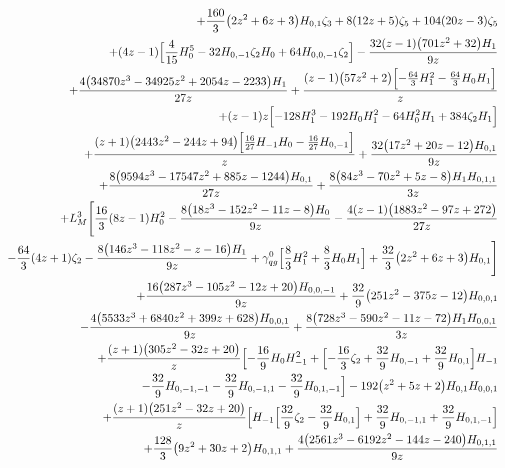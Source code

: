 \begin{eqnarray}
\nonumber \\ &&
+\frac{160}{3} \big(2 z^2+6z+3\big) H_{0,1} \zeta_3+8  (12 z+5) \zeta_5+104 (20 z-3)\zeta_5
\nonumber \\ &&
+(4 z-1) \Bigl[\frac{4}{15} H_0^5-32 H_{0,-1} \zeta_2 H_0+64H_{0,0,-1} \zeta_2\Bigr]-\frac{32  (z-1) \big(701 z^2+32\big) H_1}{9  z}
\nonumber \\ &&
+\frac{4 \big(34870 z^3-34925 z^2+2054 z-2233\big) H_1}{27 z}+\frac{(z-1)  \big(57 z^2+2\big) \Bigl[-\frac{64}{3}  H_1^2-\frac{64}{3}  H_0  H_1\Bigr]}{z}
\nonumber \\ &&
+(z-1) z \Bigl[-128  H_1^3-192  H_0 H_1^2-64 H_0^2 H_1+384  \zeta_2 H_1\Bigr]
\nonumber \\ &&
+\frac{(z+1) \big(2443 z^2-244  z+94\big) \Bigl[\frac{16}{27} H_{-1} H_0-\frac{16}{27}  H_{0,-1}\Bigr]}{z}+\frac{32  \big(17 z^2+20 z-12\big) H_{0,1}}{9  z}
\nonumber \\ &&
+\frac{8 \big(9594 z^3-17547 z^2+885 z-1244\big) H_{0,1}}{27 z}
+\frac{8 \big(84 z^3-70 z^2+5 z-8\big) H_1 H_{0,1,1}}{3 z}
\nonumber \\ &&
+L_M^3 
\Biggl[\frac{16}{3} (8 z-1) H_0^2-\frac{8  \big(18 z^3-152 z^2-11 z-8\big) H_0}{9 z}-\frac{4 (z-1) \big(1883 z^2-97  z+272\big)}{27 z}
\nonumber \\ &&
-\frac{64}{3} (4 z+1) \zeta_2-\frac{8 \big(146 z^3-118  z^2-z-16\big) H_1}{9 z}+{\gamma}_{qg}^{0} \Bigl[\frac{8}{3}H_1^2+\frac{8}{3} H_0 H_1\Bigr]
+\frac{32}{3} \big(2 z^2+6 z+3\big)H_{0,1}\Biggr]
\nonumber \\ &&
+\frac{16 \big(287 z^3-105 z^2-12 z+20\big) H_{0,0,-1}}{9  z}+\frac{32}{9}  \big(251 z^2-375 z-12\big) H_{0,0,1}
\nonumber \\ &&
-\frac{4  \big(5533 z^3+6840 z^2+399 z+628\big) H_{0,0,1}}{9 z}+\frac{8 \big(728  z^3-590 z^2-11 z-72\big) H_1 H_{0,0,1}}{3 z}
\nonumber \\ &&
+\frac{(z+1) \big(305 z^2-32 z+20\big) }{z}
\Bigl[-\frac{16}{9} H_0  H_{-1}^2+\Bigl[-\frac{16}{3} \zeta_2+\frac{32}{9} H_{0,-1}+\frac{32}{9}  H_{0,1}\Bigr] H_{-1}
\nonumber \\ &&
-\frac{32}{9} H_{0,-1,-1}-\frac{32}{9}  H_{0,-1,1}-\frac{32}{9} H_{0,1,-1}\Bigr]
-192 \big(z^2+5 z+2\big) H_{0,1}H_{0,0,1}
\nonumber \\ &&
+\frac{(z+1) \big(251 z^2-32  z+20\big) }{z}
\Bigl[H_{-1} \Bigl[\frac{32}{9}  \zeta_2
-\frac{32}{9}   H_{0,1}\Bigr]+\frac{32}{9}  H_{0,-1,1}
+\frac{32}{9}   H_{0,1,-1}\Bigr]
\nonumber \\ &&
+\frac{128}{3}  \big(9 z^2+30 z+2\big)H_{0,1,1}+\frac{4 \big(2561 z^3-6192 z^2-144 z-240\big) H_{0,1,1}}{9  z}

\end{eqnarray}

